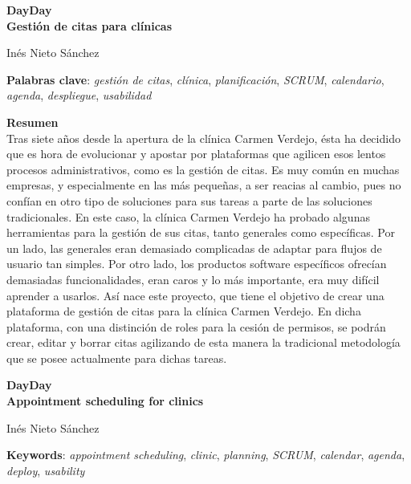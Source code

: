 \thispagestyle{empty}

\begin{center}
{\large\bfseries DayDay \\ Gestión de citas para clínicas }\\
\end{center}
\begin{center}
Inés Nieto Sánchez\\
\end{center}


\vspace{0.5cm}
\noindent\textbf{Palabras clave}: \textit{gestión de citas}, \textit{clínica}, \textit{planificación}, \textit{SCRUM}, \textit{calendario}, \textit{agenda}, \textit{despliegue}, \textit{usabilidad}
\vspace{0.7cm}

\noindent\textbf{Resumen}\\
Tras siete años desde la apertura de la clínica Carmen Verdejo, ésta ha decidido que es hora de evolucionar y apostar por plataformas que agilicen esos lentos procesos administrativos, como es la gestión de citas. Es muy común en muchas empresas, y especialmente en las más pequeñas, a ser reacias al cambio, pues no confían en otro tipo de soluciones para sus tareas a parte de las soluciones tradicionales. En este caso, la clínica Carmen Verdejo ha probado algunas herramientas para la gestión de sus citas, tanto generales como específicas. Por un lado, las generales eran demasiado complicadas de adaptar para flujos de usuario tan simples. Por otro lado, los productos software específicos ofrecían demasiadas funcionalidades, eran caros y lo más importante, era muy difícil aprender a usarlos. Así nace este proyecto, que tiene el objetivo de crear una plataforma de gestión de citas para la clínica Carmen Verdejo. En dicha plataforma, con una distinción de roles para la cesión de permisos, se podrán crear, editar y borrar citas agilizando de esta manera la tradicional metodología que se posee actualmente para dichas tareas. 
 
\cleardoublepage

\begin{center}
	{\large\bfseries DayDay \\ Appointment scheduling for clinics}\\
\end{center}
\begin{center}
	Inés Nieto Sánchez\\
\end{center}
\vspace{0.5cm}
\noindent\textbf{Keywords}: \textit{appointment scheduling}, \textit{clinic}, \textit{planning}, \textit{SCRUM}, \textit{calendar}, \textit{agenda}, \textit{deploy}, \textit{usability}
\vspace{0.7cm}


